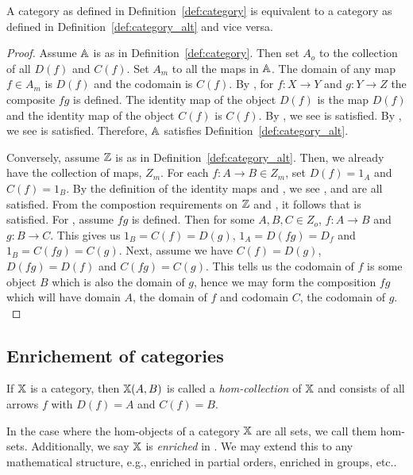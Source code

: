 \begin{lemma}\label{lem:category_is_category_alt}
  A category as defined in Definition~\ref{def:category} is equivalent to a category as defined
  in Definition~\ref{def:category_alt} and vice versa.  
\end{lemma}
\begin{proof}
  Assume $\mathbb{A}$ is as in Definition~\ref{def:category}. Then set $A_o$ to the collection of all
  $D(f)$ and $C(f)$. Set $A_m$ to all the maps in $\mathbb{A}$. The domain of any map $f \in A_m$ is $D(f)$
  and the codomain is $C(f)$. By \catthree, for $f:X\to Y$ and $g:Y \to Z$ the composite $fg$ is
  defined. The identity map of the object $D(f)$ is the map $D(f)$ and the identity map of the
  object $C(f)$ is $C(f)$. By \catfive, we see  is satisfied. By \catfour, we see
   is satisfied. Therefore, $\mathbb{A}$ satisfies Definition~\ref{def:category_alt}.
  
  Conversely, assume $\mathbb{Z}$ is as in Definition~\ref{def:category_alt}. Then, we already have the
  collection of maps, $Z_m$. For each $f : A \to B \in Z_m$, set $D(f) = 1_A$ and $C(f) = 1_B$. By
  the definition of the identity maps and , we see \catone, \cattwo and \catfive are
  all satisfied. From the compostion requirements on $\mathbb{Z}$ and , it follows that
  \catfour is satisfied. For \catthree, assume $f g$ is defined. Then for some $A,B,C \in Z_o$,
  $f:A \to B$ and $g:B \to C$. This gives us $1_B = C(f) = D(g)$, $1_A = D(f g) = D_f$ and $1_B =
  C(f g) = C(g)$. Next, assume we have $C(f) = D(g)$, $D(f g) = D(f)$ and $C(f g) = C(g)$. This
  tells us the codomain of $f$ is some object $B$ which is also the domain of $g$, hence we may
  form the composition $f g$ which will have domain $A$, the domain of $f$ and codomain $C$, the
  codomain of $g.$
\end{proof}

\subsection{Enrichement of categories} %
\label{sub:enrichement_of_categories}
\begin{definition}\label{def:hom-collection}
  If $\mathbb{X}$ is a category, then $\mathbb{X}(A,B)$ is called a \emph{hom-collection} of $\mathbb{X}$ and consists
  of all arrows $f$ with $D(f) = A$ and $C(f) = B$. 
\end{definition}

In the case where the hom-objects of a category $\mathbb{X}$ are all sets, we call them hom-sets. Additionally,
we say $\mathbb{X}$ is \emph{enriched} in \sets. We may extend this to any mathematical structure, e.g., 
enriched in partial orders, enriched in groups, etc..


